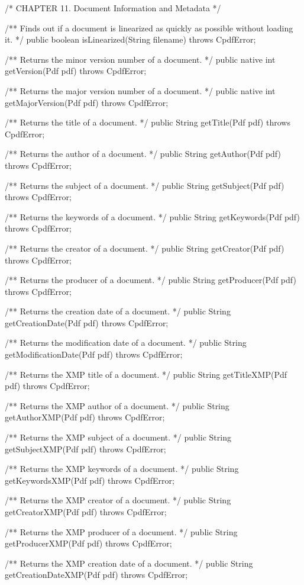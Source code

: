 /* CHAPTER 11. Document Information and Metadata */

/** Finds out if a document is linearized as quickly as possible without
loading it. */
public boolean isLinearized(String filename) throws CpdfError;

/** Returns the minor version number of a document. */
public native int getVersion(Pdf pdf) throws CpdfError;

/** Returns the major version number of a document. */
public native int getMajorVersion(Pdf pdf) throws CpdfError;

/** Returns the title of a document. */
public String getTitle(Pdf pdf) throws CpdfError;

/** Returns the author of a document. */
public String getAuthor(Pdf pdf) throws CpdfError;

/** Returns the subject of a document. */
public String getSubject(Pdf pdf) throws CpdfError;

/** Returns the keywords of a document. */
public String getKeywords(Pdf pdf) throws CpdfError;

/** Returns the creator of a document. */
public String getCreator(Pdf pdf) throws CpdfError;

/** Returns the producer of a document. */
public String getProducer(Pdf pdf) throws CpdfError;

/** Returns the creation date of a document. */
public String getCreationDate(Pdf pdf) throws CpdfError;

/** Returns the modification date of a document. */
public String getModificationDate(Pdf pdf) throws CpdfError;

/** Returns the XMP title of a document. */
public String getTitleXMP(Pdf pdf) throws CpdfError;

/** Returns the XMP author of a document. */
public String getAuthorXMP(Pdf pdf) throws CpdfError;

/** Returns the XMP subject of a document. */
public String getSubjectXMP(Pdf pdf) throws CpdfError;

/** Returns the XMP keywords of a document. */
public String getKeywordsXMP(Pdf pdf) throws CpdfError;

/** Returns the XMP creator of a document. */
public String getCreatorXMP(Pdf pdf) throws CpdfError;

/** Returns the XMP producer of a document. */
public String getProducerXMP(Pdf pdf) throws CpdfError;

/** Returns the XMP creation date of a document. */
public String getCreationDateXMP(Pdf pdf) throws CpdfError;


